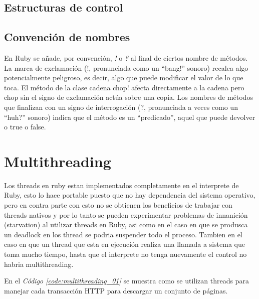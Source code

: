 \documentclass{article}
\newcommand{\refcode}[1]{\textit{Código \ref{#1}}}
\begin{document}
\subsection{Estructuras de control}


\bigskip



\subsection{Convención de nombres}

En Ruby se añade, por convención, \textit{!} o \textit{?} al final de ciertos nombre de métodos.  La marca de exclamación (!, pronunciada como un “bang!” sonoro)  recalca algo potencialmente peligroso, es decir, algo que puede modificar el valor de lo que toca. El método de la clase cadena chop! afecta directamente a la cadena pero chop sin el signo de exclamación actúa sobre una copia.
Los nombres de métodos que finalizan con un signo de interrogación (?, pronunciada a veces como un “huh?” sonoro) indica que el método es un “predicado”, aquel que puede devolver o true o false.
\bigskip




\section{Multithreading}

	Los threads en ruby estan implementados completamente en el interprete de Ruby, esto lo hace portable puesto que no hay dependencia del sistema operativo, pero en contra parte con esto no se obtienen los beneficios de trabajar con threads nativos y por lo tanto se pueden experimentar problemas de innanición (starvation) al utilizar threads en Ruby, asi como en el caso en que se produsca un deadlock en los thread se podria suspender todo el proceso. Tambien en el caso en que un thread que esta en ejecución realiza una llamada a sistema que toma mucho tiempo, hasta que el interprete no tenga nuevamente el control no habria multithreading.
	\par
	En el \refcode{code:multithreading_01} se muestra como se utilizan threads para manejar cada transacción HTTP para descargar un conjunto de páginas.

 
\bigskip
\end{document}
